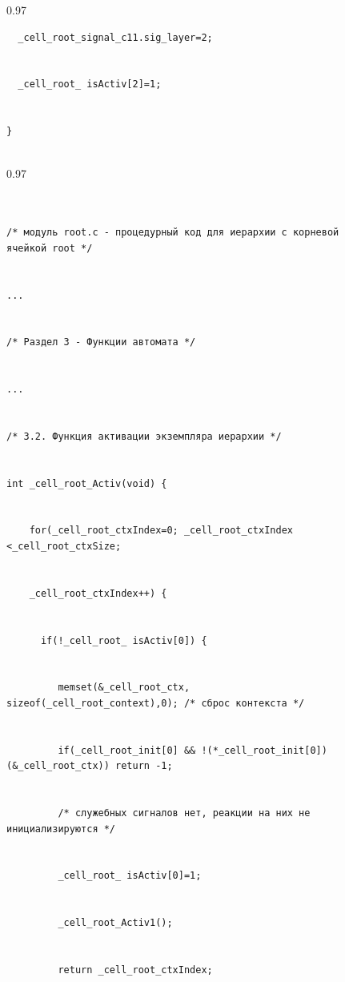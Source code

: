 \begin{figure}
\begin{center}
\begin{fmpage}{0.97\textwidth}
\begin{verbatim}
  _cell_root_signal_c11.sig_layer=2; 


  _cell_root_ isActiv[2]=1; 


}


\end{verbatim}


\end{fmpage}


\end{center}


\vspace*{-6pt}




\end{figure}





\begin{figure}\scriptsize %


\begin{center}


\begin{fmpage}{0.97\textwidth}


\begin{verbatim}


/* модуль root.c - процедурный код для иерархии с корневой ячейкой root */ 


... 


/* Раздел 3 - Функции автомата */ 


... 


/* 3.2. Функция активации экземпляра иерархии */ 


int _cell_root_Activ(void) { 


    for(_cell_root_ctxIndex=0; _cell_root_ctxIndex <_cell_root_ctxSize; 


    _cell_root_ctxIndex++) { 


      if(!_cell_root_ isActiv[0]) { 


         memset(&_cell_root_ctx, sizeof(_cell_root_context),0); /* сброс контекста */ 


         if(_cell_root_init[0] && !(*_cell_root_init[0])(&_cell_root_ctx)) return -1;  


         /* служебных сигналов нет, реакции на них не инициализируются */ 


         _cell_root_ isActiv[0]=1; 


         _cell_root_Activ1(); 


         return _cell_root_ctxIndex; 



\end{verbatim}
\end{fmpage}
\end{center}
\end{figure}
